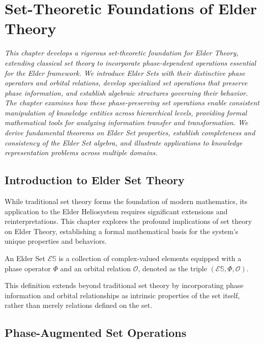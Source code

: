 \chapter{Set-Theoretic Foundations of Elder Theory}

\textit{This chapter develops a rigorous set-theoretic foundation for Elder Theory, extending classical set theory to incorporate phase-dependent operations essential for the Elder framework. We introduce Elder Sets with their distinctive phase operators and orbital relations, develop specialized set operations that preserve phase information, and establish algebraic structures governing their behavior. The chapter examines how these phase-preserving set operations enable consistent manipulation of knowledge entities across hierarchical levels, providing formal mathematical tools for analyzing information transfer and transformation. We derive fundamental theorems on Elder Set properties, establish completeness and consistency of the Elder Set algebra, and illustrate applications to knowledge representation problems across multiple domains.}

\section{Introduction to Elder Set Theory}

While traditional set theory forms the foundation of modern mathematics, its application to the Elder Heliosystem requires significant extensions and reinterpretations. This chapter explores the profound implications of set theory on Elder Theory, establishing a formal mathematical basis for the system's unique properties and behaviors.

\begin{definition}
An Elder Set $\mathcal{E}\mathbb{S}$ is a collection of complex-valued elements equipped with a phase operator $\Phi$ and an orbital relation $\mathcal{O}$, denoted as the triple $(\mathcal{E}\mathbb{S}, \Phi, \mathcal{O})$.
\end{definition}

This definition extends beyond traditional set theory by incorporating phase information and orbital relationships as intrinsic properties of the set itself, rather than merely relations defined on the set.

\section{Phase-Augmented Set Operations}

